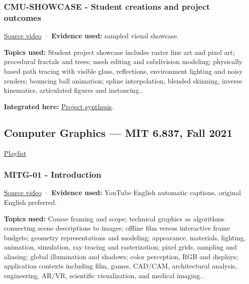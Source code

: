 \subsubsection{CMU-SHOWCASE - Student creations and project outcomes}\label{04-visual-computing-ii-ch036-cmu-showcase---student-creations-and-project-outcomes}

\hypertarget{04-visual-computing-ii-ch036-cmu-showcase---student-creations-and-project-outcomes}{}

\href{https://www.youtube.com/watch?v=yJ5eY3EIImA}{Source video} · \textbf{Evidence used:} sampled visual showcase.

\textbf{Topics used:} Student project showcase includes raster line art and pixel art; procedural fractals and trees; mesh editing and subdivision modeling; physically based path tracing with visible glass, reflections, environment lighting and noisy renders; bouncing ball animation; spline interpolation, blended skinning, inverse kinematics, articulated figures and instancing..

\textbf{Integrated here:} \hyperref[04-visual-computing-ii-ch034-photographic-workflow-and-integrated-decisions]{Project synthesis}.

\subsection{Computer Graphics --- MIT 6.837, Fall 2021}\label{04-visual-computing-ii-ch036-computer-graphics-mit-6.837-fall-2021}

\hypertarget{04-visual-computing-ii-ch036-computer-graphics-mit-6.837-fall-2021}{}

\href{https://www.youtube.com/playlist?list=PLQ3UicqQtfNtqt2yL3KgKV-yn0NEPbRVi}{Playlist}

\subsubsection{MITG-01 - Introduction}\label{04-visual-computing-ii-ch036-mitg-01---introduction}

\hypertarget{04-visual-computing-ii-ch036-mitg-01---introduction}{}

\href{https://www.youtube.com/watch?v=tPzC879i-ag}{Source video} · \textbf{Evidence used:} YouTube English automatic captions, original English preferred.

\textbf{Topics used:} Course framing and scope; technical graphics as algorithms connecting scene descriptions to images; offline film versus interactive frame budgets; geometry representations and modeling; appearance, materials, lighting, animation, simulation, ray tracing and rasterization; pixel grids, sampling and aliasing; global illumination and shadows; color perception, RGB and displays; application contexts including film, games, CAD/CAM, architectural analysis, engineering, AR/VR, scientific visualization, and medical imaging..

